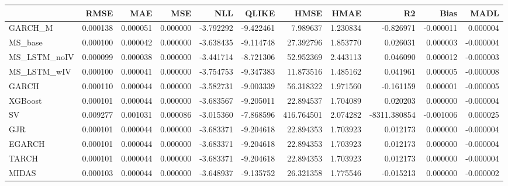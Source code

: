 \begin{tabular}{lrrrrrrrrrr}
\toprule
 & RMSE & MAE & MSE & NLL & QLIKE & HMSE & HMAE & R2 & Bias & MADL \\
\midrule
GARCH_M & 0.000138 & 0.000051 & 0.000000 & -3.792292 & -9.422461 & 7.989637 & 1.230834 & -0.826971 & -0.000011 & 0.000004 \\
MS_base & 0.000100 & 0.000042 & 0.000000 & -3.638435 & -9.114748 & 27.392796 & 1.853770 & 0.026031 & 0.000003 & -0.000004 \\
MS_LSTM_noIV & 0.000099 & 0.000038 & 0.000000 & -3.441714 & -8.721306 & 52.952369 & 2.443113 & 0.046090 & 0.000012 & -0.000003 \\
MS_LSTM_wIV & 0.000100 & 0.000041 & 0.000000 & -3.754753 & -9.347383 & 11.873516 & 1.485162 & 0.041961 & 0.000005 & -0.000008 \\
GARCH & 0.000110 & 0.000044 & 0.000000 & -3.582731 & -9.003339 & 56.318322 & 1.971560 & -0.161159 & 0.000001 & -0.000005 \\
XGBoost & 0.000101 & 0.000044 & 0.000000 & -3.683567 & -9.205011 & 22.894537 & 1.704089 & 0.020203 & 0.000000 & -0.000004 \\
SV & 0.009277 & 0.001031 & 0.000086 & -3.015360 & -7.868596 & 416.764501 & 2.074282 & -8311.380854 & -0.001006 & 0.000025 \\
GJR & 0.000101 & 0.000044 & 0.000000 & -3.683371 & -9.204618 & 22.894353 & 1.703923 & 0.012173 & 0.000000 & -0.000004 \\
EGARCH & 0.000101 & 0.000044 & 0.000000 & -3.683371 & -9.204618 & 22.894353 & 1.703923 & 0.012173 & 0.000000 & -0.000004 \\
TARCH & 0.000101 & 0.000044 & 0.000000 & -3.683371 & -9.204618 & 22.894353 & 1.703923 & 0.012173 & 0.000000 & -0.000004 \\
MIDAS & 0.000103 & 0.000044 & 0.000000 & -3.648937 & -9.135752 & 26.321358 & 1.775546 & -0.015213 & 0.000000 & -0.000002 \\
\bottomrule
\end{tabular}
